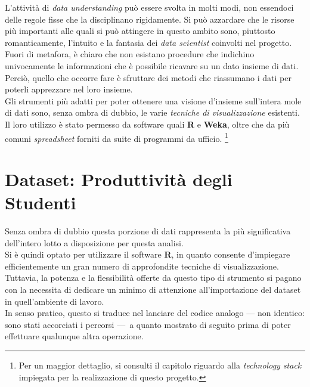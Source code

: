 L'attività di \textit{data understanding} può essere svolta in molti modi, non essendoci delle regole fisse che la disciplinano rigidamente. Si può azzardare che le risorse più importanti alle quali si può attingere in questo ambito sono, piuttosto romanticamente, l'intuito e la fantasia dei \textit{data scientist} coinvolti nel progetto. Fuori di metafora, è chiaro che non esistano procedure che indichino univocamente le informazioni che è possibile ricavare su un dato insieme di dati. Perciò, quello che occorre fare è sfruttare dei metodi che riassumano i dati per poterli apprezzare nel loro insieme. \\

Gli strumenti più adatti per poter ottenere una visione d'insieme sull'intera mole di dati sono, senza ombra di dubbio, le varie \textit{tecniche di visualizzazione} esistenti. Il loro utilizzo è stato permesso da software quali \textbf{R} e \textbf{Weka}, oltre che da più comuni \textit{spreadsheet} forniti da suite di programmi da ufficio. \footnote{Per un maggior dettaglio, si consulti il capitolo riguardo alla \textit{technology stack} impiegata per la realizzazione di questo progetto.}


\section{Dataset: Produttività degli Studenti}


Senza ombra di dubbio questa porzione di dati rappresenta la più significativa dell'intero lotto a disposizione per questa analisi. \\

Si è quindi optato per utilizzare il software \textbf{R}, in quanto consente d'impiegare efficientemente un gran numero di approfondite tecniche di visualizzazione. Tuttavia, la potenza e la flessibilità offerte da questo tipo di strumento si pagano con la necessita di dedicare un minimo di attenzione all'importazione del dataset in quell'ambiente di lavoro. \\

In senso pratico, questo si traduce nel lanciare del codice analogo \footnotesize{--- non identico: sono stati accorciati i percorsi ---}\normalsize\ a quanto mostrato di seguito prima di poter effettuare qualunque altra operazione.

